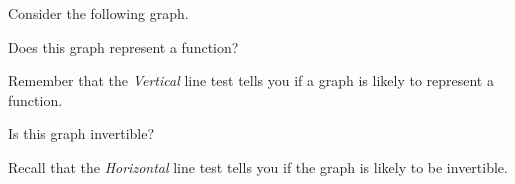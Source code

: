 \documentclass{ximera}
\begin{document}
\begin{problem}
    Consider the following graph.
    \begin{center}
    \end{center}
    
    Does this graph represent a function?
    \begin{multipleChoice}
    \end{multipleChoice}
    \begin{feedback}
        Remember that the \textit{Vertical} line test tells you if a graph is likely to represent a function.
    \end{feedback}
    
    \begin{problem}
        Is this graph invertible?
        \begin{multipleChoice}
        \end{multipleChoice}
        \begin{feedback}
            Recall that the \textit{Horizontal} line test tells you if the graph is likely to be invertible.
        \end{feedback}
    \end{problem}
\end{problem}
\end{document}
